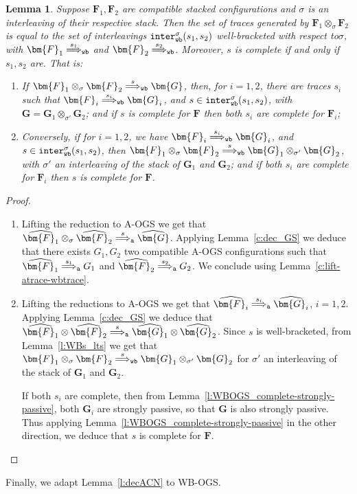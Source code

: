 \documentclass[11pt,a4paper]{amsart}
\theoremstyle{plain}
\theoremstyle{definition}
\theoremstyle{defC}
\theoremstyle{thmC}
\theoremstyle{plain}
\numberwithin{equation}{section}
\newcommand{\wrt}{with respect to\xspace}  %
\newcommand{\tr}{s}
\newcommand{\stt}{\sigma}
\newcommand{\AOGS}{\mbox{{\rm A-OGS}}\xspace}      %
\newcommand{\WBOGS}{\mbox{{\rm WB-OGS}}\xspace}      %
\newcommand{\rmm}[1]{{\tt{\lowercase{#1}}}}
\newcommand{\genArr}[2]{\mathrel{\stackrel{{#1}}{\Longrightarrow}_{\rmm{\lowercase{#2}}}}}  %
\newcommand{\ArrA}[1]{\genArr{#1}{A}}  %
\newcommand{\ArrWB}[1]{\genArr{#1}{WB}}          %
\newcommand{\interlWBs}[3]{{\tt inter_{wb}^{#1}}( #2, #3)}
\newcommand{\FF}{F}
\newcommand{\GG}{G}
\newcommand{\FFb}{{\bm{\FF}}} %
\newcommand{\GGb}{{\bm{\GG}}} %
\newcommand{\es}{\eraseStack}
\newcommand{\eraseStack}[1]{\widehat{#1}}
\theoremstyle{plain}
\newtheorem{lemma}[thm]{Lemma}
\theoremstyle{definition}
\begin{document}
\begin{lemma}
\label{c:dec_GS_WB}
Suppose $\FFb_1,\FFb_2$ are compatible stacked configurations
and $\stt$ is an interleaving of their respective stack.
Then the set of traces generated by $\FFb_1 \otimes_{\stt} \FFb_2$
is equal to the set of interleavings 
$\interlWBs{\stt}{\tr_1}{\tr_2}$ well-bracketed \wrt $\stt$,
with $\FFb_1 \ArrWB{\tr_1}$ and $\FFb_2 \ArrWB{\tr_2}$.
Moreover, $\tr$ is complete if and only if $\tr_1,\tr_2$ are.
That is:
\begin{enumerate}
  \item If $\FFb_1 \otimes_{\stt} \FFb_2 \ArrWB \tr  \GGb$, then, 
  for $i=1,2$,  there are traces $\tr_i$
  such that ${\FFb_i}\ArrWB{\tr_i} \GGb_i$, 
  and $\tr \in \interlWBs{\stt}{\tr_1}{\tr_2}$, 
  with $\GGb = \GGb_1 \otimes_{\stt'} \GGb_2$;
  and if $\tr$ is complete for $\FFb$ then both $\tr_i$ are complete for $\FFb_i$;
  \item Conversely, if for  $i=1,2$, we have
  ${\FFb_i} \ArrWB {\tr_i} \GGb_i$,  
  and $\tr \in \interlWBs{\stt}{\tr_1}{\tr_2}$, 
  then $\FFb_1 \otimes_{\stt} \FFb_2 \ArrWB{\tr} 
  \GGb_1 \otimes_{\stt'} \GGb_2$, with $\stt'$
  an interleaving of the stack of $\GGb_1$ and $\GGb_2$;
  and if both $\tr_i$ are complete for $\FFb_i$ then $\tr$ is complete for $\FFb$.
\end{enumerate} 
\end{lemma}

\begin{proof}
  \begin{enumerate}
    \item Lifting the reduction to \AOGS we get that
    $\es{\FFb_1} \otimes_{\stt} \es{\FFb_2} \ArrA{\tr} \es{\GGb}$.
    Applying Lemma~\ref{c:dec_GS} we deduce that there exists
    $\GG_1,\GG_2$ two compatible \AOGS configurations
    such that $\es{\FFb_1} \ArrA{\tr_1} \GG_1$
    and $\es{\FFb_2} \ArrA{\tr_2} \GG_2$.
    We conclude using Lemma~\ref{c:lift-atrace-wbtrace}.
    \item Lifting the reductions to \AOGS we get that
    ${\es{\FFb_i}} \ArrA {\tr_i} \es{\GGb_i}$, $i=1,2$.
    Applying Lemma~\ref{c:dec_GS} we deduce that 
    $\es{\FFb_1} \otimes \es{\FFb_2} \ArrA{\tr} \es{\GGb_1} \otimes \es{\GGb_2}$.
    Since $\tr$ is well-bracketed,
    from Lemma~\ref{l:WBs_lts}
    we get that
    $\FFb_1 \otimes_{\stt} \FFb_2 \ArrWB{\tr} 
     \GGb_1 \otimes_{\stt'} \GGb_2$
    for $\stt'$
    an interleaving of the stack of $\GGb_1$ and $\GGb_2$.

\noindent
    If both $\tr_i$ are complete, then from Lemma~\ref{l:WBOGS_complete-strongly-passive},
    both $\GGb_i$ are strongly passive, so that $\GGb$ is also strongly passive.
    Thus applying Lemma~\ref{l:WBOGS_complete-strongly-passive} in the other direction, 
    we deduce that $\tr$ is complete for $\FFb$.
    \qedhere
  \end{enumerate}
\end{proof}
\noindent
Finally, we adapt Lemma~\ref{l:decACN} to \WBOGS.
\end{document}
